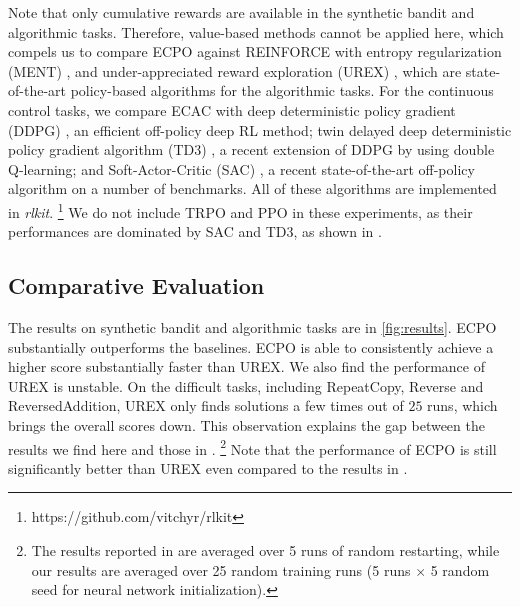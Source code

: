 Note that only cumulative rewards are available in the
synthetic bandit and algorithmic tasks.
Therefore, value-based methods cannot be applied here, which compels us to compare ECPO against
REINFORCE with entropy regularization (MENT) \citep{williams1992simple},
and under-appreciated reward exploration (UREX) \citep{nachum2017improving}, which are state-of-the-art policy-based algorithms for the algorithmic tasks.
%
For the continuous control tasks, we compare ECAC
with deep deterministic policy gradient (DDPG) \citep{lillicrap2015continuous},
an efficient off-policy deep RL method;
twin delayed deep deterministic policy gradient algorithm (TD3)
\citep{fujimoto2018addressing},
a recent extension of DDPG by using double Q-learning;
and Soft-Actor-Critic (SAC) \citep{haarnoja2018soft},
a recent state-of-the-art off-policy algorithm on a number of benchmarks.
All of these algorithms are implemented in \emph{rlkit}.%
%
\footnote{
https://github.com/vitchyr/rlkit
}
We do not include TRPO and PPO in these experiments,
as their performances are dominated by SAC and TD3,
as shown in \citep{haarnoja2018soft,fujimoto2018addressing}. 

\subsection{Comparative Evaluation}

The results on synthetic bandit and algorithmic tasks are  
in \cref{fig:results}. 
ECPO substantially outperforms the baselines.
ECPO is able to consistently achieve a higher score substantially faster than UREX.
We also find the performance of UREX is unstable.
On the difficult tasks, including RepeatCopy, Reverse and ReversedAddition,
UREX only finds solutions a few times out of $25$ runs,
which brings the overall scores down.
This observation explains the gap between the results we find here
and those in \citep{nachum2017improving}.%
%
\footnote{
The results reported in \citep{nachum2017improving} are averaged over 
5 runs of random restarting,
while our results are averaged over 25 random training runs
(5 runs $\times$ 5 random seed for neural network initialization). 
}
Note that the performance of ECPO is still significantly better than
UREX even compared to the results in \citep{nachum2017improving}. 


